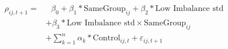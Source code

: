 \textsl{}\begin{equation}
\begin{split}
\rho_{ij,t+1} = & \text{ 	}\beta_0 + \beta_1* \text{SameGroup}_{ij} + \beta_2* \text{Low Imbalance std} \\
&+  \beta_3 * \text{Low Imbalance std} \times \text{SameGroup}_{ij}  \\
  & + \sum_{k=1} ^{n} \alpha_k*\text{Control}_{ij,t} + \varepsilon_{ij,t+1}
\end{split}
\label{model1S}
\end{equation}